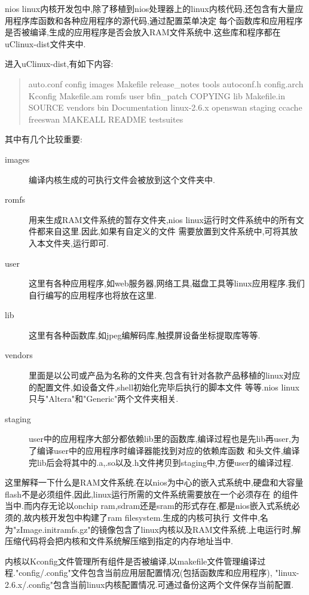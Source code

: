 \documentclass[12pt,a4paper,titlepage]{article}
\begin{document}
nios linux内核开发包中,除了移植到nios处理器上的linux内核代码,还包含有大量应用程序库函数和各种应用程序的源代码,通过配置菜单决定
每个函数库和应用程序是否被编译,生成的应用程序是否会放入RAM文件系统中.这些库和程序都在uClinux-dist文件夹中.

进入uClinux-dist,有如下内容:
\begin{quote}
auto.conf  config         images       Makefile     release\_notes  tools
autoconf.h  config.arch    Kconfig      Makefile.am  romfs          user
bfin\_patch  COPYING        lib          Makefile.in  SOURCE         vendors
bin         Documentation  linux-2.6.x  openswan     staging
ccache      freeswan       MAKEALL      README       testsuites
\end{quote}
其中有几个比较重要:
\begin{description}
\item[images] 编译内核生成的可执行文件会被放到这个文件夹中.
\item[romfs] 用来生成RAM文件系统的暂存文件夹,nios linux运行时文件系统中的所有文件都来自这里.因此,如果有自定义的文件
需要放置到文件系统中,可将其放入本文件夹,运行即可.
\item[user] 这里有各种应用程序,如web服务器,网络工具,磁盘工具等linux应用程序.我们自行编写的应用程序也将放在这里.
\item[lib] 这里有各种函数库,如jpeg编解码库,触摸屏设备坐标提取库等等.
\item[vendors] 里面是以公司或产品为名称的文件夹,包含有针对各款产品移植的linux对应的配置文件,如设备文件,shell初始化完毕后执行的脚本文件
等等.nios linux只与"Altera"和"Generic"两个文件夹相关.
\item[staging] user中的应用程序大部分都依赖lib里的函数库,编译过程也是先lib再user,为了编译user中的应用程序时编译器能找到对应的依赖库函数
和头文件,编译完lib后会将其中的.a,.so以及.h文件拷贝到staging中,方便user的编译过程.
\end{description}

这里解释一下什么是RAM文件系统.在以nios为中心的嵌入式系统中,硬盘和大容量flash不是必须组件,因此,linux运行所需的文件系统需要放在一个必须存在
的组件当中.而内存无论以onchip ram,sdram还是sram的形式存在,都是nios嵌入式系统必须的,故内核开发包中构建了ram filesystem.生成的内核可执行
文件中,名为"zImage.initramfs.gz"的镜像包含了linux内核以及RAM文件系统.上电运行时,解压缩代码将会把内核和文件系统解压缩到指定的内存地址当中.

内核以Kconfig文件管理所有组件是否被编译,以makefile文件管理编译过程."config/.config"文件包含当前应用层配置情况(包括函数库和应用程序),
"linux-2.6.x/.config"包含当前linux内核配置情况.可通过备份这两个文件保存当前配置.
\end{document}
